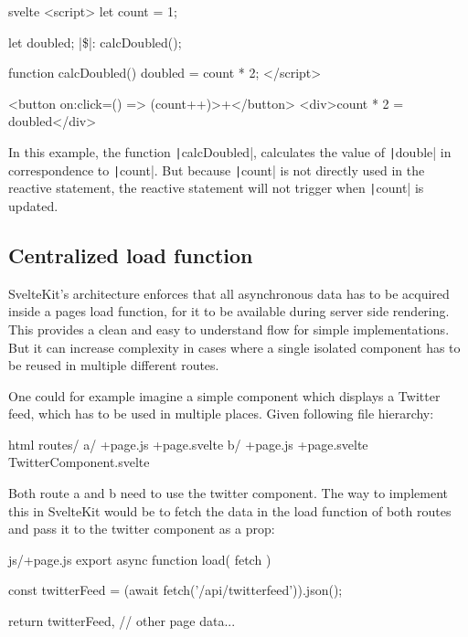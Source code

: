 \begin{myminted}[escapeinside=||, autogobble]{svelte}{}
<script>
    let count = 1;

    let doubled;
    |\$|: calcDoubled();

    function calcDoubled() {
    doubled = count * 2;
    }
</script>

<button on:click={() => (count++)}>+</button>
<div>{count} * 2 = {doubled}</div>
\end{myminted}

In this example, the function \texttt|calcDoubled|, calculates the value of \texttt|double| in correspondence to \texttt|count|. But because \texttt|count| is not directly used in the reactive statement, the reactive statement will not trigger when \texttt|count| is updated.

\subsection{Centralized load function}

SvelteKit's architecture enforces that all asynchronous data has to be acquired inside a pages load function, for it to be available during server side rendering. This provides a clean and easy to understand flow for simple implementations. But it can increase complexity in cases where a single isolated component has to be reused in multiple different routes.

One could for example imagine a simple component which displays a Twitter feed, which has to be used in multiple places. Given following file hierarchy:

\begin{myminted}{html}{}
routes/
  a/
    +page.js
    +page.svelte
  b/
    +page.js
    +page.svelte
  TwitterComponent.svelte
\end{myminted}

Both route a and b need to use the twitter component. The way to implement this in SvelteKit would be to fetch the data in the load function of both routes and pass it to the twitter component as a prop:

\begin{myminted}{js}{/+page.js}
export async function load({ fetch }) {

    const twitterFeed = (await fetch('/api/twitterfeed')).json();

    return {
        twitterFeed,
        // other page data...
    }
}

\end{myminted}

